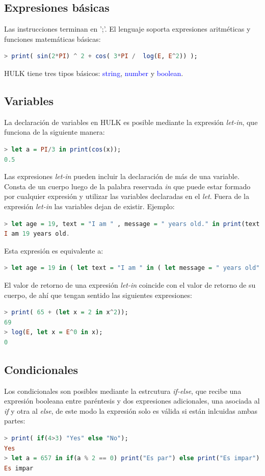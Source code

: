 \documentclass[a4paper, 12pt]{article}
\begin{document}
\subsection{Expresiones básicas}
Las instrucciones terminan en ';'. El lenguaje soporta expresiones aritméticas  y funciones matemáticas básicas:
\begin{lstlisting}[language= Haskell]
> print( sin(2*PI) ^ 2 + cos( 3*PI /  log(E, E^2)) ); 
\end{lstlisting}
 HULK tiene tres tipos básicos: \textcolor{blue}{string}, \textcolor{blue}{number} y \textcolor{blue}{boolean}.

\subsection{Variables}
La declaración de variables en HULK es posible mediante la expresión \textit{let-in}, que funciona de la siguiente manera:
\begin{lstlisting}[language= Haskell]
> let a = PI/3 in print(cos(x));
0.5
\end{lstlisting}
Las expresiones \textit{let-in} pueden incluir la declaración de más de una variable. Consta de un cuerpo luego de la palabra reservada \textit{in}  que puede estar formado por cualquier expresión y utilizar las variables declaradas en el \textit{let}. Fuera de la expresión \textit{let-in} las variables dejan de existir.
Ejemplo:
\begin{lstlisting}[language= Haskell]
> let age = 19, text = "I am " , message = " years old." in print(text @ age @ message);
I am 19 years old.
\end{lstlisting}
Esta expresión es equivalente a:
\begin{lstlisting}[language= Haskell]
> let age = 19 in ( let text = "I am " in ( let message = " years old"  in print(text @ age @ message))); 
\end{lstlisting}

El valor de retorno de una  expresión \textit{let-in} coincide con el valor de retorno de su cuerpo, de ahí que tengan sentido las siguientes expresiones:
\begin{lstlisting}[language= Haskell]
> print( 65 + (let x = 2 in x^2));
69
> log(E, let x = E^0 in x);
0
\end{lstlisting}


\subsection{Condicionales}
Los condicionales son posibles mediante la estrcutura \textit{if-else}, que recibe una expresión booleana entre paréntesis y dos expresiones adicionales, una asociada al \textit{if} y otra al \textit{else}, de este modo la expresión solo es válida si están inlcuidas ambas partes:
\begin{lstlisting}[language= Haskell]
> print( if(4>3) "Yes" else "No");
Yes
> let a = 657 in if(a % 2 == 0) print("Es par") else print("Es impar");
Es impar
\end{lstlisting}
\end{document}
